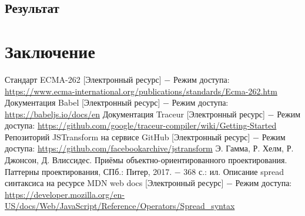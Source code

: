 \documentclass[14pt, a4paper]{article}
\begin{document}


\subsection{Результат}
\pagebreak
\section{Заключение}
\pagebreak

\begin{thebibliography}{9}
   Стандарт ECMA-262 [Электронный ресурс] $-$ Режим доступа: \linebreak
    \url{https://www.ecma-international.org/publications/standards/Ecma-262.htm}
   Документация Babel [Электронный ресурс] $-$ Режим доступа: \linebreak
    \url{https://babeljs.io/docs/en}
   Документация Traceur [Электронный ресурс] $-$ Режим доступа: \linebreak
    \url{https://github.com/google/traceur-compiler/wiki/Getting-Started}
   Репозиторий JSTransform на сервисе GitHub [Электронный ресурс] $-$ Режим доступа:
    \url{https://github.com/facebookarchive/jstransform}
   Э. Гамма, Р. Хелм, Р. Джонсон, Д. Влиссидес. Приёмы объектно-ориентированного проектирования. Паттерны проектирования, СПб.: Питер, 2017. $-$ 368 с.: ил.
   Описание spread синтаксиса на ресурсе MDN web docs [Электронный ресурс] $-$ Режим доступа:
    \url{https://developer.mozilla.org/en-US/docs/Web/JavaScript/Reference/Operators/Spread_syntax}
\end{thebibliography}
\end{document}
